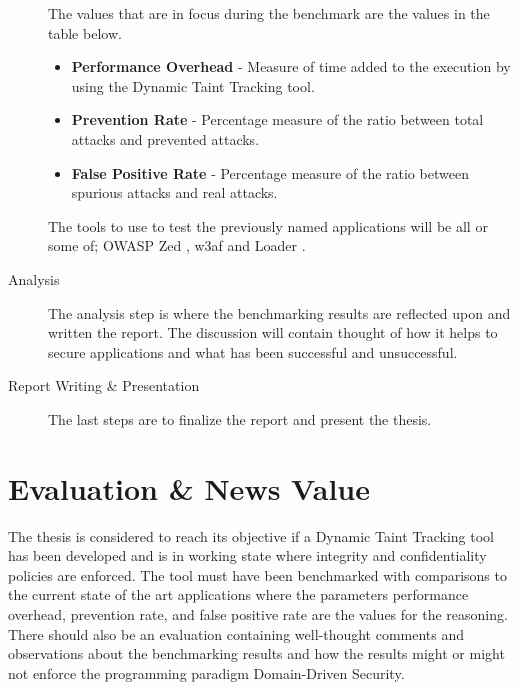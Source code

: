 \documentclass{../kththesis}
\begin{document}
\begin{description}
			The values that are in focus during the benchmark are the values in the table below. 
			
			\begin{itemize}  
					\item \textbf{Performance Overhead} - Measure of time added to the execution by using the Dynamic Taint Tracking tool.
					\item \textbf{Prevention Rate} - Percentage measure of the ratio between total attacks and prevented attacks.
					\item \textbf{False Positive Rate} - Percentage measure of the ratio between spurious attacks and real attacks.
			\end{itemize}
	
			The tools to use to test the previously named applications will be all or some of; OWASP Zed \parencite{zed}, w3af \parencite{w3af} and Loader \parencite{loader}.
	
			\item [Analysis]
			The analysis step is where the benchmarking results are reflected upon and written the report. The discussion will contain thought of how it helps to secure applications and what has been successful and unsuccessful.
	
			\item [Report Writing \& Presentation]
			The last steps are to finalize the report and present the thesis.
	\end{description}
	
	
	
	\chapter{Evaluation \& News Value}
	The thesis is considered to reach its objective if a Dynamic Taint Tracking tool has been developed and is in working state where integrity and confidentiality policies are enforced. The tool must have been benchmarked with comparisons to the current state of the art applications where the parameters performance overhead, prevention rate, and false positive rate are the values for the reasoning. There should also be an evaluation containing well-thought comments and observations about the benchmarking results and how the results might or might not enforce the programming paradigm Domain-Driven Security.
	
\end{document}
